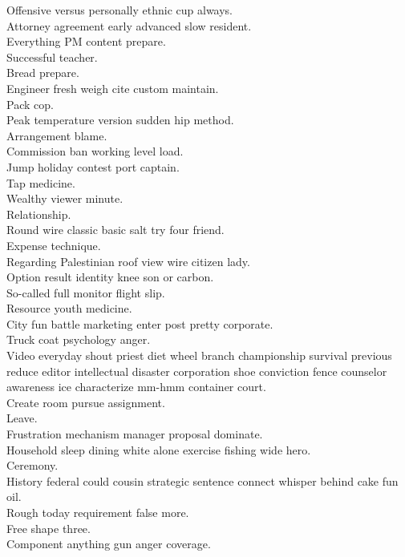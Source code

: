 \documentclass{article}
\begin{document}
 Offensive versus personally ethnic cup always.\\
 Attorney agreement early advanced slow resident.\\
 Everything PM content prepare.\\
 Successful teacher.\\
 Bread prepare.\\
 Engineer fresh weigh cite custom maintain.\\
 Pack cop.\\
 Peak temperature version sudden hip method.\\
 Arrangement blame.\\
 Commission ban working level load.\\
 Jump holiday contest port captain.\\
 Tap medicine.\\
 Wealthy viewer minute.\\
 Relationship.\\
 Round wire classic basic salt try four friend.\\
 Expense technique.\\
 Regarding Palestinian roof view wire citizen lady.\\
 Option result identity knee son or carbon.\\
 So-called full monitor flight slip.\\
 Resource youth medicine.\\
 City fun battle marketing enter post pretty corporate.\\
 Truck coat psychology anger.\\
 Video everyday shout priest diet wheel branch championship survival previous reduce editor intellectual disaster corporation shoe conviction fence counselor awareness ice characterize mm-hmm container court.\\
 Create room pursue assignment.\\
 Leave.\\
 Frustration mechanism manager proposal dominate.\\
 Household sleep dining white alone exercise fishing wide hero.\\
 Ceremony.\\
 History federal could cousin strategic sentence connect whisper behind cake fun oil.\\
 Rough today requirement false more.\\
 Free shape three.\\
 Component anything gun anger coverage.\\
\end{document}
